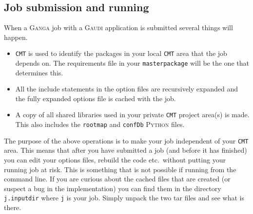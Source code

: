 \documentclass{howto}
\def\ganga {\textsc{Ganga}\xspace}
\def\python {\textsc{Python}\xspace}
\def\gaudi {\textsc{Gaudi}\xspace}
\begin{document}
\subsection{Job submission and running}
\label{sec:GaudiConfigAndRun}
When a \ganga job with a \gaudi application is submitted several things will
happen.
\begin{itemize}
\item \texttt{CMT} is used to identify the packages in your local \texttt{CMT}
  area that the job depends on. The requirements file in your
  \texttt{masterpackage} will be the one that determines this.
\item All the include statements in the option files are recursively expanded
  and the fully expanded options file is cached with the job.
\item A copy of all shared libraries used in your private \texttt{CMT} project
  area(s) is made. This also includes the \texttt{rootmap} and \texttt{confDb}
  \python files.
\end{itemize}
The purpose of the above operations is to make your job independent of your
\texttt{CMT} area. This means that after you have submitted a job (and before
it has finished) you can edit your options files, rebuild the code etc.\
without putting your running job at risk. This is something that is not
possible if running from the command line. If you are curious about the cached
files that are created (or suspect a bug in the implementation) you can find
them in the directory \texttt{j.inputdir} where \texttt{j} is your job. Simply 
unpack the two tar files and see what is there.
\end{document}
